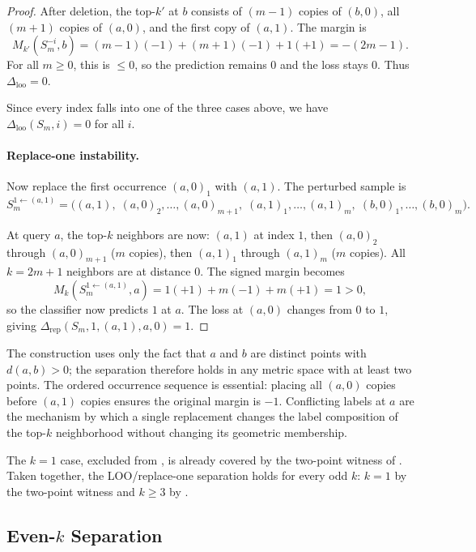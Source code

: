 \begin{proof}
After deletion, the top-$k'$ at $b$ consists of $(m-1)$ copies of $(b,0)$,
all $(m+1)$ copies of $(a,0)$, and the first copy of $(a,1)$. The margin is
\[
M_{k'}(S_m^{-i}, b) = (m-1)(-1) + (m+1)(-1) + 1(+1) = -(2m-1).
\]
For all $m \ge 0$, this is $\le 0$, so the prediction remains $0$ and the
loss stays $0$. Thus $\Delta_{\mathrm{loo}} = 0$.

Since every index falls into one of the three cases above, we have
$\Delta_{\mathrm{loo}}(S_m, i) = 0$ for all $i$.

\paragraph{Replace-one instability.}
Now replace the first occurrence $(a,0)_1$ with $(a,1)$. The perturbed
sample is
\[
S_m^{1 \leftarrow (a,1)} = \big((a,1),\; (a,0)_2,\ldots,(a,0)_{m+1},\;
                             (a,1)_1,\ldots,(a,1)_m,\;
                             (b,0)_1,\ldots,(b,0)_m\big).
\]

At query $a$, the top-$k$ neighbors are now: $(a,1)$ at index $1$, then
$(a,0)_2$ through $(a,0)_{m+1}$ ($m$ copies), then $(a,1)_1$ through
$(a,1)_m$ ($m$ copies). All $k = 2m+1$ neighbors are at distance $0$. The
signed margin becomes
\[
M_k(S_m^{1 \leftarrow (a,1)}, a) = 1(+1) + m(-1) + m(+1) = 1 > 0,
\]
so the classifier now predicts $1$ at $a$. The loss at $(a,0)$ changes from
$0$ to $1$, giving $\Delta_{\mathrm{rep}}(S_m, 1, (a,1), a, 0) = 1$.
\end{proof}

The construction uses only the fact that $a$ and $b$ are distinct points with
$d(a,b) > 0$; the separation therefore holds in any metric space with at least
two points. The ordered occurrence sequence is essential: placing all $(a,0)$
copies before $(a,1)$ copies ensures the original margin is $-1$. Conflicting
labels at $a$ are the mechanism by which a single replacement changes the label
composition of the top-$k$ neighborhood without changing its geometric
membership.

The $k=1$ case, excluded from , is already covered
by the two-point witness of . Taken together, the
LOO/replace-one separation holds for every odd $k$: $k=1$ by the two-point
witness and $k \ge 3$ by .

\subsection{Even-$k$ Separation}

